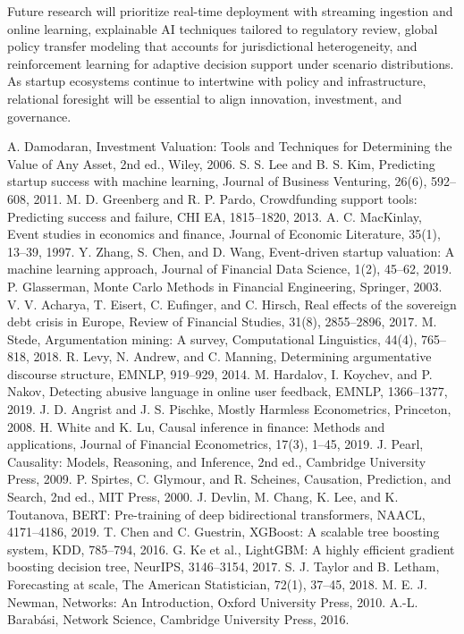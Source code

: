 \documentclass[conference]{IEEEtran}
\begin{document}
Future research will prioritize real-time deployment with streaming ingestion and online learning, explainable AI techniques tailored to regulatory review, global policy transfer modeling that accounts for jurisdictional heterogeneity, and reinforcement learning for adaptive decision support under scenario distributions. As startup ecosystems continue to intertwine with policy and infrastructure, relational foresight will be essential to align innovation, investment, and governance.

\begin{thebibliography}{99}
 A. Damodaran, Investment Valuation: Tools and Techniques for Determining the Value of Any Asset, 2nd ed., Wiley, 2006.
 S. S. Lee and B. S. Kim, Predicting startup success with machine learning, Journal of Business Venturing, 26(6), 592--608, 2011.
 M. D. Greenberg and R. P. Pardo, Crowdfunding support tools: Predicting success and failure, CHI EA, 1815--1820, 2013.
 A. C. MacKinlay, Event studies in economics and finance, Journal of Economic Literature, 35(1), 13--39, 1997.
 Y. Zhang, S. Chen, and D. Wang, Event-driven startup valuation: A machine learning approach, Journal of Financial Data Science, 1(2), 45--62, 2019.
 P. Glasserman, Monte Carlo Methods in Financial Engineering, Springer, 2003.
 V. V. Acharya, T. Eisert, C. Eufinger, and C. Hirsch, Real effects of the sovereign debt crisis in Europe, Review of Financial Studies, 31(8), 2855--2896, 2017.
 M. Stede, Argumentation mining: A survey, Computational Linguistics, 44(4), 765--818, 2018.
 R. Levy, N. Andrew, and C. Manning, Determining argumentative discourse structure, EMNLP, 919--929, 2014.
 M. Hardalov, I. Koychev, and P. Nakov, Detecting abusive language in online user feedback, EMNLP, 1366--1377, 2019.
 J. D. Angrist and J. S. Pischke, Mostly Harmless Econometrics, Princeton, 2008.
 H. White and K. Lu, Causal inference in finance: Methods and applications, Journal of Financial Econometrics, 17(3), 1--45, 2019.
 J. Pearl, Causality: Models, Reasoning, and Inference, 2nd ed., Cambridge University Press, 2009.
 P. Spirtes, C. Glymour, and R. Scheines, Causation, Prediction, and Search, 2nd ed., MIT Press, 2000.
 J. Devlin, M. Chang, K. Lee, and K. Toutanova, BERT: Pre-training of deep bidirectional transformers, NAACL, 4171--4186, 2019.
 T. Chen and C. Guestrin, XGBoost: A scalable tree boosting system, KDD, 785--794, 2016.
 G. Ke et al., LightGBM: A highly efficient gradient boosting decision tree, NeurIPS, 3146--3154, 2017.
 S. J. Taylor and B. Letham, Forecasting at scale, The American Statistician, 72(1), 37--45, 2018.
 M. E. J. Newman, Networks: An Introduction, Oxford University Press, 2010.
 A.-L. Barab\'asi, Network Science, Cambridge University Press, 2016.
\end{thebibliography}
\end{document}

